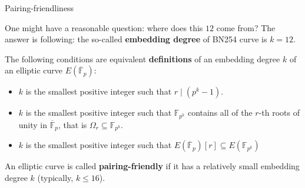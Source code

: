 \documentclass{zkdl-presentation-template}
\begin{document}
    \begin{frame}{Pairing-friendliness}
        \begin{remark}
            One might have a reasonable question: where does this $12$ come from? The answer is following: the so-called \textbf{embedding degree} of BN254 curve is $k=12$.
        \end{remark}

        \pause\begin{definition}
            The following conditions are equivalent \textbf{definitions} of an embedding degree $k$ of an elliptic curve $E(\overline{\mathbb{F}}_p)$:
            \begin{itemize}
                \item \pause$k$ is the smallest positive integer such that $r \mid (p^k-1)$.
                \item \pause$k$ is the smallest positive integer such that $\mathbb{F}_{p^k}$ contains all of the $r$-th roots of unity in $\overline{\mathbb{F}}_p$, that is $\Omega_r \subseteq \mathbb{F}_{p^k}$.
                \item \pause$k$ is the smallest positive integer such that $E(\overline{\mathbb{F}}_p)[r] \subseteq E(\mathbb{F}_{p^k})$
            \end{itemize}
            \pause An elliptic curve is called \textbf{pairing-friendly} if it has a relatively small embedding degree $k$ (typically, $k \leq 16$).
        \end{definition}
    \end{frame}
\end{document}

